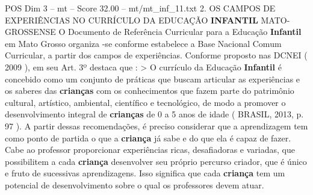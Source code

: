 \begin{textsample}{POS Dim 3 – mt – Score 32.00 – mt/mt\_inf\_11.txt}  \label{ex:f3_pos_071}
2.
OS CAMPOS DE EXPERIÊNCIAS NO CURRÍCULO DA EDUCAÇÃO \textbf{INFANTIL} MATO-GROSSENSE O Documento de Referência Curricular para a Educação \textbf{Infantil} em Mato Grosso organiza -se conforme estabelece a Base Nacional Comum Curricular, a partir dos campos de experiências.
Conforme proposto nas DCNEI ( 2009 ), em seu Art. 3º destaca que : > O currículo da Educação \textbf{Infantil} é concebido como um conjunto de práticas que buscam articular as experiências e os saberes das \textbf{crianças} com os conhecimentos que fazem parte do patrimônio cultural, artístico, ambiental, científico e tecnológico, de modo a promover o desenvolvimento integral de \textbf{crianças} de 0 a 5 anos de idade ( BRASIL, 2013, p. 97 ).
A partir dessas recomendações, é preciso considerar que a aprendizagem tem como ponto de partida o que a \textbf{criança} já sabe e do que ela é capaz de fazer.
Cabe ao professor proporcionar experiências ricas, desafiadoras e variadas, que possibilitem a cada \textbf{criança} desenvolver seu próprio percurso criador, que é único e fruto de sucessivas aprendizagens.
Isso significa que cada \textbf{criança} tem um potencial de desenvolvimento sobre o qual os professores devem atuar.

\end{textsample}
